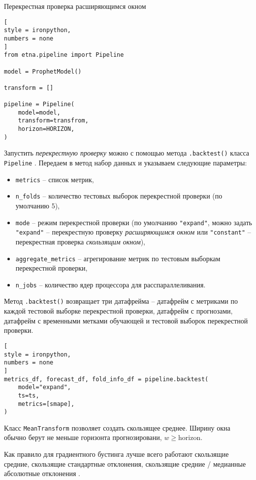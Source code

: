 \documentclass[%
	11pt,
	a4paper,
	utf8,
		]{article}
\begin{document}
Перекрестная проверка расширяющимся окном
\begin{lstlisting}[
style = ironpython,
numbers = none
]
from etna.pipeline import Pipeline

model = ProphetModel()

transform = []

pipeline = Pipeline(
    model=model,
    transform=transfrom,
    horizon=HORIZON,
)
\end{lstlisting}

Запустить \emph{перекрестную проверку} можно с помощью метода \verb|.backtest()| класса \verb|Pipeline| \cite[]{gruzdev:time-series-2022}. Передаем в метод набор данных и указываем следующие параметры:
\begin{itemize}
	\item \verb|metrics| -- список метрик,
	
	\item \verb|n_folds| -- количество тестовых выборок перекрестной проверки (по умолчанию 5),
	
	\item \verb|mode| -- режим перекрестной проверки (по умолчанию \verb|"expand"|, можно задать \verb|"expand"| -- перекрестную проверку \emph{расширяющимся окном} или \verb|"constant"| -- перекрестная проверка \emph{скользящим окном}),
	
	\item \verb|aggregate_metrics| -- агрегирование метрик по тестовым выборкам перекрестной проверки,
	
	\item \verb|n_jobs| -- количество ядер процессора для расспараллеливания.
\end{itemize}

Метод \verb|.backtest()| возвращает три датафрейма -- датафрейм с метриками по каждой тестовой выборке перекрестной проверки, датафрейм с прогнозами, датафрейм с временными метками обучающей и тестовой выборок перекрестной проверки.
\begin{lstlisting}[
style = ironpython,
numbers = none
]
metrics_df, forecast_df, fold_info_df = pipeline.backtest(
    model="expand",
    ts=ts, 
    metrics=[smape],
)
\end{lstlisting}

Класс \verb|MeanTransform| позволяет создать скользящее среднее. Ширину окна обычно берут не меньше горизонта прогнозировани, $w \geqslant \text{horizon}$.

Как правило для градиентного бустинга лучше всего работают скользящие средние, скользящие стандартные отклонения, скользящие средние / медианные абсолютные отклонения \cite[]{gruzdev:time-series-2022}.
\end{document}
